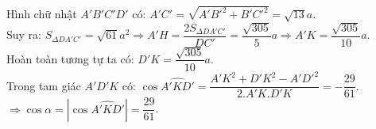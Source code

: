 \begin{ex}
{{
        }
        Hình chữ nhật $A'B'C'D'$ có: $A'C'=\sqrt{A'{B'}^2+B'{C'}^2}=\sqrt{13}a$.\\		
        Suy ra: $S_{\Delta DA'C'}=\sqrt{61}a^2 \Rightarrow A'H=\dfrac{2S_{\Delta DA'C'}}{DC'}=\dfrac{\sqrt{305}}{5}a \Rightarrow A'K=\dfrac{\sqrt{305}}{10}a$. \\
        Hoàn toàn tương tự ta có: $D'K=\dfrac{\sqrt{305}}{10}a$. \\
        Trong tam giác $A'D'K$ có: $\cos \widehat{A'KD'}=\dfrac{A'K^2+D'K^2-A'{D'}^2}{2.A'K.D'K}=-\dfrac{29}{61}$. \\
        $ \Rightarrow \cos \alpha =\left|\cos \widehat{A'KD'}\right|=\dfrac{29}{61}$.
    }
\end{ex}

